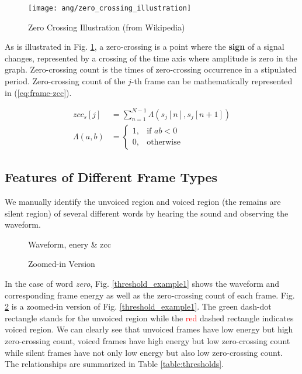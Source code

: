 \begin{figure}[H]
\centering
\texttt{[image: ang/zero\_crossing\_illustration]}
\caption{Zero Crossing Illustration (from Wikipedia)}
\label{zero_crossing_illustration}
\end{figure}

As is illustrated in Fig. \ref{zero_crossing_illustration}, a zero-crossing is a point where the \textbf{sign} of a signal changes, represented by a crossing of the time axis where amplitude is zero in the graph. Zero-crossing count is the times of zero-crossing occurrence in a stipulated period. Zero-crossing count of the $j$-th frame can be mathematically represented in (\ref{eq:frame-zcc}).

\begin{align}
\label{eq:frame-zcc}
zcc_s[j] &= \sum_{n=1}^{N-1} \Lambda ( s_j[n], s_j[n+1] )\\
\Lambda ( a, b ) &=
\begin{cases}
1, &\text{if } ab < 0\\
0, &\text{otherwise}
\end{cases}
\end{align}


\subsection{Features of Different Frame Types}

We manually identify the unvoiced region and voiced region (the remains are silent region) of several different words by hearing the sound and observing the waveform.

\begin{figure}[H]
\begin{minipage}[t]{0.5\linewidth}
\centering
{}
\caption{Waveform, enery \& zcc}
\label{threshold_example1}
\end{minipage}
\begin{minipage}[t]{0.5\linewidth}
\centering
{}
\caption{Zoomed-in Version}
\label{threshold_example2}
\end{minipage}
\end{figure}

In the case of word \textit{zero}, Fig. \ref{threshold_example1} shows the waveform and corresponding frame energy as well as the zero-crossing count of each frame. Fig. \ref{threshold_example2} is a zoomed-in version of Fig. \ref{threshold_example1}. The \textcolor{green_html}{green} dash-dot rectangle stands for the unvoiced region while the \textcolor{red}{red} dashed rectangle indicates voiced region. We can clearly see that unvoiced frames have low energy but high zero-crossing count, voiced frames have high energy but low zero-crossing count while silent frames have not only low energy but also low zero-crossing count. The relationships are summarized in Table \ref{table:thresholds}.

